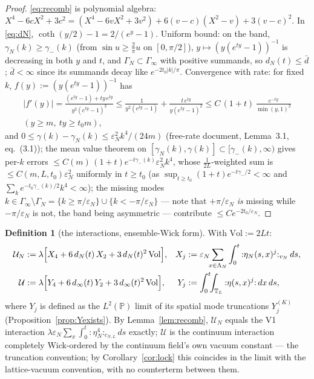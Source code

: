 \documentclass[11pt,a4paper]{article}
\theoremstyle{plain}
\theoremstyle{definition}
\newtheorem{definition}[theorem]{Definition}
\newcommand{\T}{\mathbb{T}}
\newcommand{\PP}{\mathbb{P}}
\newcommand{\eps}{\varepsilon}
\newcommand{\U}{\mathcal U}
\DeclareMathOperator{\cth}{coth}
\begin{document}
\begin{proof}
\eqref{eq:recomb} is polynomial algebra:
$X^4-6cX^2+3c^2=(X^4-6vX^2+3v^2)+6(v-c)(X^2-v)+3(v-c)^2$. In \eqref{eq:dN},
$\cth(y/2)-1=2/(e^y-1)$. Uniform bound: on the band,
$\gamma_N(k)\ge\gamma_-(k)$ (from $\sin u\ge\frac2\pi u$ on
$[0,\pi/2]$), $y\mapsto(y(e^{ty}-1))^{-1}$ is decreasing in both $y$ and $t$,
and $\Gamma_N\subset\Gamma_\infty$ with positive summands, so $d_N(t)\le\bar
d$; $\bar d<\infty$ since its summands decay like $e^{-2t_0|k|/\pi}$.
Convergence with rate: for fixed $k$, $f(y):=(y(e^{ty}-1))^{-1}$ has
\begin{gather*}
 |f'(y)|=\frac{(e^{ty}-1)+ty\,e^{ty}}{y^2(e^{ty}-1)^2}
 \le\frac1{y^2(e^{ty}-1)}+\frac{t\,e^{ty}}{y(e^{ty}-1)^2}
 \le C\,(1+t)\,\frac{e^{-ty}}{\min(y,1)^2}\\
 (y\ge m,\ ty\ge t_0m),
\end{gather*}
and $0\le\gamma(k)-\gamma_N(k)\le\eps_N^2k^4/(24m)$ (free-rate document,
Lemma~3.1, eq.~(3.1)); the mean value theorem on
$[\gamma_N(k),\gamma(k)]\subset[\gamma_-(k),\infty)$ gives per-$k$ errors
$\le C(m)\,(1+t)e^{-t\gamma_-(k)}\eps_N^2k^4$, whose $\frac1{2L}$-weighted sum
is $\le C(m,L,t_0)\eps_N^2$ uniformly in $t\ge t_0$ (as
$\sup_{t\ge t_0}(1+t)e^{-t\gamma_-/2}<\infty$ and
$\sum_ke^{-t_0\gamma_-(k)/2}k^4<\infty$); the missing modes
$k\in\Gamma_\infty\setminus\Gamma_N=\{k\ge\pi/\eps_N\}\cup\{k<-\pi/\eps_N\}$ --- note
that $+\pi/\eps_N$ \emph{is} missing while $-\pi/\eps_N$ is not, the band being
asymmetric --- contribute $\le Ce^{-2t_0/\eps_N}$.
\end{proof}

\begin{definition}[the interactions, ensemble-Wick form]\label{def:U}
With $\mathrm{Vol}:=2Lt$:
\begin{align}
 \U_N&:=\lambda\Bigl[X_4+6\,d_N(t)\,X_2+3\,d_N(t)^2\,\mathrm{Vol}\Bigr],&
 X_j&:=\eps_N\!\!\sum_{x\in\Lambda_N}\int_0^t
 {:}\eta_N(s,x)^j{:}_{v_N}\,ds,
 \label{eq:UN}\\
 \U&:=\lambda\Bigl[Y_4+6\,d_\infty(t)\,Y_2+3\,d_\infty(t)^2\,
 \mathrm{Vol}\Bigr],&
 Y_j&:=\int_0^t\!\!\int_{\T_L}{:}\eta(s,x)^j{:}\,dx\,ds ,
 \label{eq:Uc}
\end{align}
where $Y_j$ is defined as the $L^2(\PP)$ limit of its spatial mode
truncations $Y_j^{(K)}$ (Proposition~\ref{prop:Yexists}). By
Lemma~\ref{lem:recomb}, $\U_N$ equals the V1 interaction
$\lambda\eps_N\sum_x\int_0^t{:}\eta_N^4{:}_{c_{N,L}}ds$ exactly; $\U$ is the
continuum interaction completely Wick-ordered by the continuum field's own
vacuum constant --- the truncation convention; by Corollary~\ref{cor:lock}
this coincides in the limit with the lattice-vacuum convention, with no
counterterm between them.
\end{definition}
\end{document}
